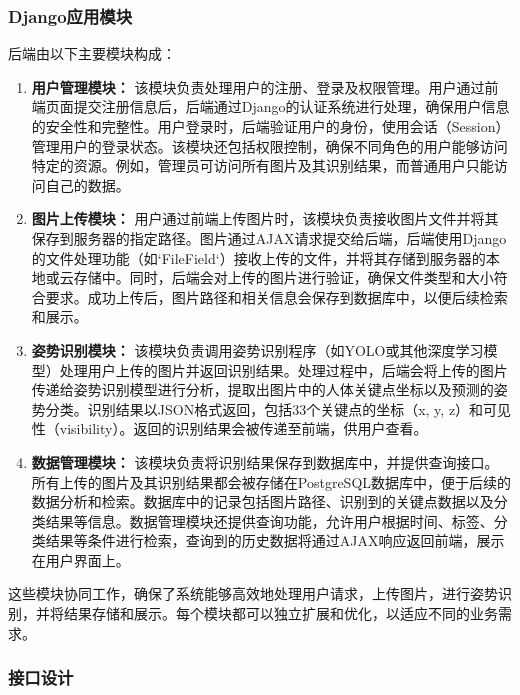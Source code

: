 \subsubsection{Django应用模块}

后端由以下主要模块构成：

\begin{enumerate}
    \item \textbf{用户管理模块：}
    该模块负责处理用户的注册、登录及权限管理。用户通过前端页面提交注册信息后，后端通过Django的认证系统进行处理，确保用户信息的安全性和完整性。用户登录时，后端验证用户的身份，使用会话（Session）管理用户的登录状态。该模块还包括权限控制，确保不同角色的用户能够访问特定的资源。例如，管理员可访问所有图片及其识别结果，而普通用户只能访问自己的数据。

    \item \textbf{图片上传模块：}
    用户通过前端上传图片时，该模块负责接收图片文件并将其保存到服务器的指定路径。图片通过AJAX请求提交给后端，后端使用Django的文件处理功能（如`FileField`）接收上传的文件，并将其存储到服务器的本地或云存储中。同时，后端会对上传的图片进行验证，确保文件类型和大小符合要求。成功上传后，图片路径和相关信息会保存到数据库中，以便后续检索和展示。

    \item \textbf{姿势识别模块：}
    该模块负责调用姿势识别程序（如YOLO或其他深度学习模型）处理用户上传的图片并返回识别结果。处理过程中，后端会将上传的图片传递给姿势识别模型进行分析，提取出图片中的人体关键点坐标以及预测的姿势分类。识别结果以JSON格式返回，包括33个关键点的坐标（x, y, z）和可见性（visibility）。返回的识别结果会被传递至前端，供用户查看。

    \item \textbf{数据管理模块：}
    该模块负责将识别结果保存到数据库中，并提供查询接口。所有上传的图片及其识别结果都会被存储在PostgreSQL数据库中，便于后续的数据分析和检索。数据库中的记录包括图片路径、识别到的关键点数据以及分类结果等信息。数据管理模块还提供查询功能，允许用户根据时间、标签、分类结果等条件进行检索，查询到的历史数据将通过AJAX响应返回前端，展示在用户界面上。

\end{enumerate}

这些模块协同工作，确保了系统能够高效地处理用户请求，上传图片，进行姿势识别，并将结果存储和展示。每个模块都可以独立扩展和优化，以适应不同的业务需求。


\subsubsection{接口设计}

